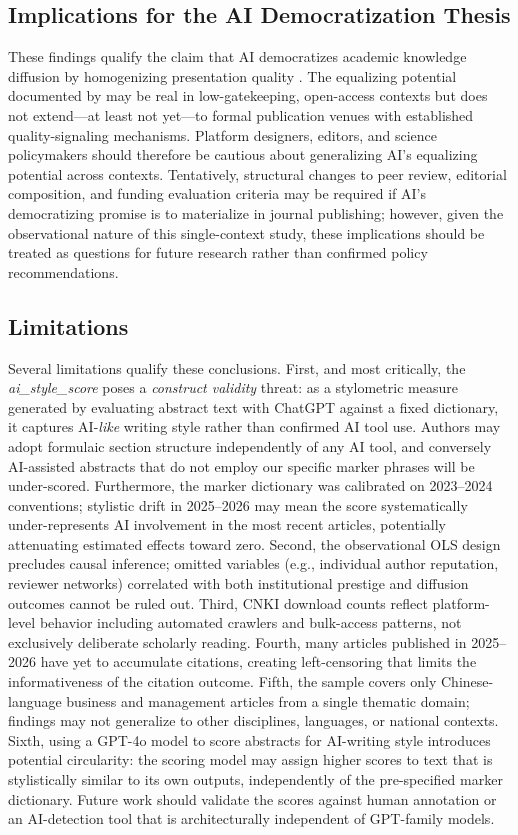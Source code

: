 \documentclass[12pt,a4paper]{article}
\begin{document}
\subsection{Implications for the AI Democratization Thesis}

These findings qualify the claim that AI democratizes academic
knowledge diffusion by homogenizing presentation quality
\citep{Huang2021,Liang2024}.
The equalizing potential documented by \citet{JoLi2026} may be
real in low-gatekeeping, open-access contexts but does not extend---at
least not yet---to formal publication venues with established
quality-signaling mechanisms.
Platform designers, editors, and science policymakers should therefore
be cautious about generalizing AI's equalizing potential across
contexts.
Tentatively, structural changes to peer review, editorial composition,
and funding evaluation criteria may be required if AI's democratizing
promise is to materialize in journal publishing; however, given the
observational nature of this single-context study, these implications
should be treated as questions for future research rather than
confirmed policy recommendations.

\subsection{Limitations}

Several limitations qualify these conclusions.
First, and most critically, the \textit{ai\_style\_score} poses a
\textit{construct validity} threat: as a stylometric measure generated
by evaluating abstract text with ChatGPT against a fixed dictionary,
it captures AI-\textit{like} writing style rather than confirmed
AI tool use.
Authors may adopt formulaic section structure independently of any AI
tool, and conversely AI-assisted abstracts that do not employ
our specific marker phrases will be under-scored.
Furthermore, the marker dictionary was calibrated on 2023--2024
conventions; stylistic drift in 2025--2026 may mean the score
systematically under-represents AI involvement in the most recent
articles, potentially attenuating estimated effects toward zero.
Second, the observational OLS design precludes causal inference;
omitted variables (e.g., individual author reputation, reviewer networks)
correlated with both institutional prestige and diffusion outcomes
cannot be ruled out.
Third, CNKI download counts reflect platform-level behavior including
automated crawlers and bulk-access patterns, not exclusively deliberate
scholarly reading.
Fourth, many articles published in 2025--2026 have yet to accumulate
citations, creating left-censoring that limits the informativeness of
the citation outcome.
Fifth, the sample covers only Chinese-language business and management
articles from a single thematic domain; findings may not generalize
to other disciplines, languages, or national contexts.
Sixth, using a GPT-4o model to score abstracts for AI-writing style
introduces potential circularity: the scoring model may assign higher
scores to text that is stylistically similar to its own outputs,
independently of the pre-specified marker dictionary.
Future work should validate the scores against human annotation or
an AI-detection tool that is architecturally independent of GPT-family
models.
\end{document}
